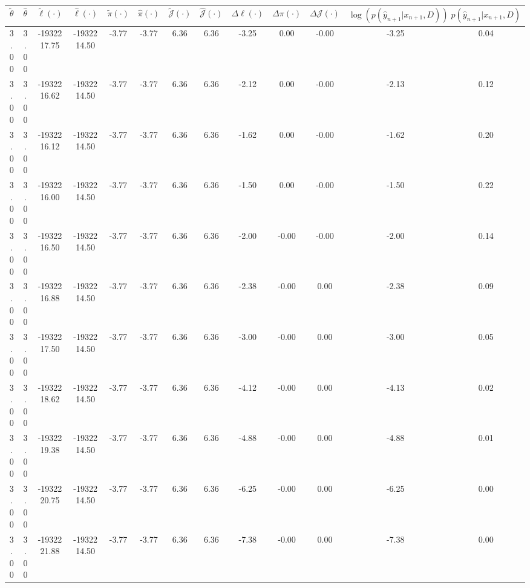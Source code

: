 \begin{table}[htbp]
        \centering
        \tiny
        \begin{adjustbox}{angle=90}
            \begin{tabular}{|c|c|c|c|c|c|c|c|c|c|c|c|c|}
                \hline
                 $\tilde{\theta}$ & $\hat{\theta}$ & $\tilde{\ell}(\cdot)$ & $\hat{\ell}(\cdot)$ & $\tilde{\pi}(\cdot)$ & $\hat{\pi}(\cdot)$ & $\tilde{\mathcal{J}}(\cdot)$ & $\hat{\mathcal{J}}(\cdot)$ & $\Delta \ell(\cdot)$ & $\Delta \pi(\cdot)$ & $\Delta \mathcal{J}(\cdot)$ & $\log(p(\hat{y}_{n+1}|x_{n+1}, D))$ & $p(\hat{y}_{n+1}|x_{n+1}, D)$ \\
                \hline
                 3.00 & 3.00 & -1932217.75 & -1932214.50 & -3.77 & -3.77 & 6.36 & 6.36 & -3.25 & 0.00 & -0.00 & -3.25 & 0.04\\ \hline
 3.00 & 3.00 & -1932216.62 & -1932214.50 & -3.77 & -3.77 & 6.36 & 6.36 & -2.12 & 0.00 & -0.00 & -2.13 & 0.12\\ \hline
 3.00 & 3.00 & -1932216.12 & -1932214.50 & -3.77 & -3.77 & 6.36 & 6.36 & -1.62 & 0.00 & -0.00 & -1.62 & 0.20\\ \hline
 3.00 & 3.00 & -1932216.00 & -1932214.50 & -3.77 & -3.77 & 6.36 & 6.36 & -1.50 & 0.00 & -0.00 & -1.50 & 0.22\\ \hline
 3.00 & 3.00 & -1932216.50 & -1932214.50 & -3.77 & -3.77 & 6.36 & 6.36 & -2.00 & -0.00 & -0.00 & -2.00 & 0.14\\ \hline
 3.00 & 3.00 & -1932216.88 & -1932214.50 & -3.77 & -3.77 & 6.36 & 6.36 & -2.38 & -0.00 & 0.00 & -2.38 & 0.09\\ \hline
 3.00 & 3.00 & -1932217.50 & -1932214.50 & -3.77 & -3.77 & 6.36 & 6.36 & -3.00 & -0.00 & 0.00 & -3.00 & 0.05\\ \hline
 3.00 & 3.00 & -1932218.62 & -1932214.50 & -3.77 & -3.77 & 6.36 & 6.36 & -4.12 & -0.00 & 0.00 & -4.13 & 0.02\\ \hline
 3.00 & 3.00 & -1932219.38 & -1932214.50 & -3.77 & -3.77 & 6.36 & 6.36 & -4.88 & -0.00 & 0.00 & -4.88 & 0.01\\ \hline
 3.00 & 3.00 & -1932220.75 & -1932214.50 & -3.77 & -3.77 & 6.36 & 6.36 & -6.25 & -0.00 & 0.00 & -6.25 & 0.00\\ \hline
 3.00 & 3.00 & -1932221.88 & -1932214.50 & -3.77 & -3.77 & 6.36 & 6.36 & -7.38 & -0.00 & 0.00 & -7.38 & 0.00\\ \hline
            \end{tabular}
        \end{adjustbox}
        \caption{}
        \label{}
    \end{table}
    